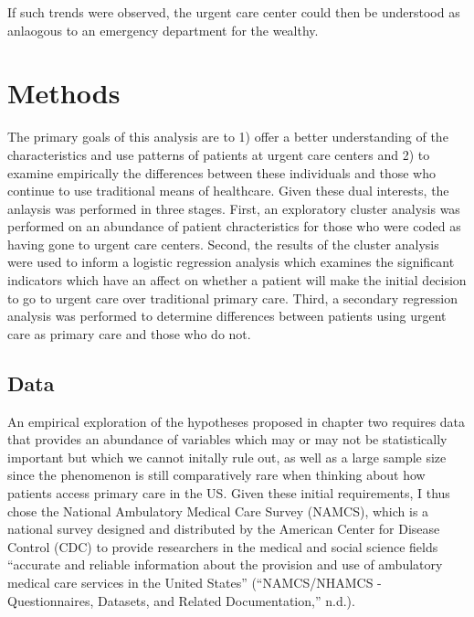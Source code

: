 \documentclass[12pt,twoside]{reedthesis}
\begin{document}
  If such trends were observed, the urgent care center could then be
  understood as anlaogous to an emergency department for the wealthy.
  
  \onehalfspacing
  
  \chapter{Methods}\label{methods}
  
  The primary goals of this analysis are to 1) offer a better
  understanding of the characteristics and use patterns of patients at
  urgent care centers and 2) to examine empirically the differences
  between these individuals and those who continue to use traditional
  means of healthcare. Given these dual interests, the anlaysis was
  performed in three stages. First, an exploratory cluster analysis was
  performed on an abundance of patient chracteristics for those who were
  coded as having gone to urgent care centers. Second, the results of the
  cluster analysis were used to inform a logistic regression analysis
  which examines the significant indicators which have an affect on
  whether a patient will make the initial decision to go to urgent care
  over traditional primary care. Third, a secondary regression analysis
  was performed to determine differences between patients using urgent
  care as primary care and those who do not.
  
  \section{Data}\label{data}
  
  An empirical exploration of the hypotheses proposed in chapter two
  requires data that provides an abundance of variables which may or may
  not be statistically important but which we cannot initally rule out, as
  well as a large sample size since the phenomenon is still comparatively
  rare when thinking about how patients access primary care in the US.
  Given these initial requirements, I thus chose the National Ambulatory
  Medical Care Survey (NAMCS), which is a national survey designed and
  distributed by the American Center for Disease Control (CDC) to provide
  researchers in the medical and social science fields ``accurate and
  reliable information about the provision and use of ambulatory medical
  care services in the United States'' (``NAMCS/NHAMCS - Questionnaires,
  Datasets, and Related Documentation,'' n.d.).
  
\end{document}
